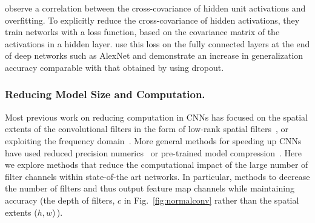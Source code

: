 \documentclass[thesis]{subfiles}
\begin{document}
	\citet{Cogswell2016} observe a correlation between the cross-covariance of hidden unit activations and overfitting. To explicitly reduce the cross-covariance of hidden activations, they train networks with a loss function, based on the covariance matrix of the activations in a hidden layer. \citet{Cogswell2016} use this loss on the fully connected layers at the end of deep networks such as AlexNet and demonstrate an increase in generalization accuracy comparable with that obtained by using dropout.
	
	
	
	\subsubsection{Reducing Model Size and Computation.}
	\label{regularizingstructure}
	Most previous work on reducing computation in CNNs has focused on the spatial extents of the convolutional filters in the form of low-rank spatial filters~\citep{mamalet2012simplifying,journals/corr/JaderbergVZ14, journals/pami/SironiTRLF15, journals/corr/LebedevGROL14, Ioannou2016}, or exploiting the frequency domain~\cite{mathieu2013fast,rippel2015spectral}. More general methods for speeding up CNNs have used reduced precision numerics~\cite{1502.02551v1} or pre-trained model compression~\cite{Chen2015,Kim2016}. Here we explore methods that reduce the computational impact of the large number of filter channels within state-of-the art networks. In particular, methods to decrease the number of filters and thus output feature map channels while maintaining accuracy (\ie the depth of filters, $c$ in Fig.~\ref{fig:normalconv} rather than the spatial extents ($h, w$)\,).
	
\end{document}
